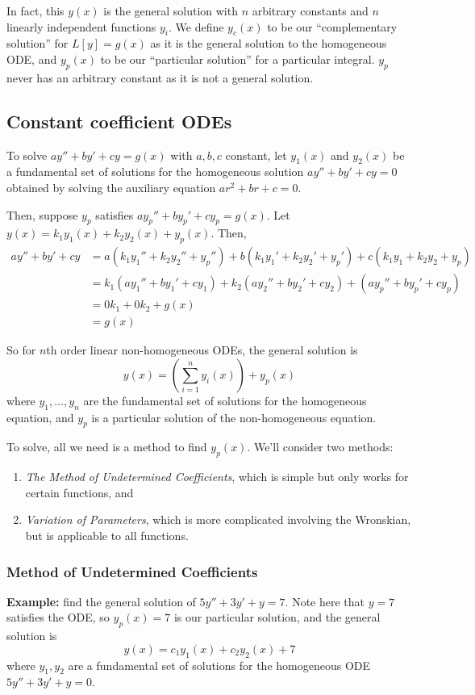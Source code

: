 \documentclass[11pt]{article}
\newcommand{\example}{\textbf{Example: }}
\begin{document}
	In fact, this $y(x)$ is the general solution with $n$ arbitrary constants and $n$ linearly independent functions $y_i$. We define $y_c(x)$ to be our ``complementary solution'' for $L[y] = g(x)$ as it is the general solution to the homogeneous ODE, and $y_p(x)$ to be our ``particular solution'' for a particular integral. $y_p$ never has an arbitrary constant as it is not a general solution.

\subsection{Constant coefficient ODEs}
	To solve $ay'' + by' + cy = g(x)$ with $a,b,c$ constant, let $y_1 (x)$ and $y_2 (x)$ be a fundamental set of solutions for the homogeneous solution $ay'' + by' + cy = 0$ obtained by solving the auxiliary equation $ar^2 + br + c = 0$.

	Then, suppose $y_p$ satisfies $ay_p'' + by_p' + cy_p = g(x)$. Let $y(x) = k_1 y_1 (x) + k_2 y_2 (x) + y_p (x)$. Then,
		\begin{align*}
			ay'' + by' + cy &= a(k_1 y_1'' + k_2 y_2'' + y_p'') + b(k_1 y_1' + k_2 y_2' + y_p') + c(k_1 y_1 + k_2 y_2 + y_p) \\
				&= k_1 (ay_1'' + by_1' + cy_1) + k_2 (ay_2'' + by_2' + cy_2) + (ay_p'' + by_p' + cy_p) \\
				&= 0 k_1 + 0 k_2 + g(x) \\
				&= g(x)
		\end{align*}

	So for $n$th order linear non-homogeneous ODEs, the general solution is
		$$ y(x) = \left(\sum_{i=1}^n y_i(x)\right) + y_p(x) $$
	where $y_1, \ldots, y_n$ are the fundamental set of solutions for the homogeneous equation, and $y_p$ is a particular solution of the non-homogeneous equation.

	To solve, all we need is a method to find $y_p(x)$. We'll consider two methods:
		\begin{enumerate}
			\item \emph{The Method of Undetermined Coefficients}, which is simple but only works for certain functions, and
			\item \emph{Variation of Parameters}, which is more complicated involving the Wronskian, but is applicable to all functions.
		\end{enumerate}

\subsubsection{Method of Undetermined Coefficients}
	\example find the general solution of $5 y'' + 3y' + y = 7$. Note here that $y=7$ satisfies the ODE, so $y_p(x) = 7$ is our particular solution, and the general solution is
		$$ y(x) = c_1 y_1 (x) + c_2 y_2 (x) + 7 $$
	where $y_1, y_2$ are a fundamental set of solutions for the homogeneous ODE $5y'' + 3y' + y = 0$.
\end{document}
